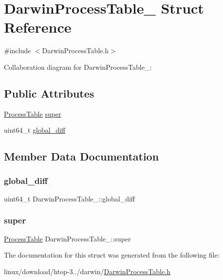\hypertarget{structDarwinProcessTable__}{}\section{Darwin\+Process\+Table\+\_\+ Struct Reference}
\label{structDarwinProcessTable__}


{\ttfamily \#include $<$Darwin\+Process\+Table.\+h$>$}



Collaboration diagram for Darwin\+Process\+Table\+\_\+\+:
\subsection*{Public Attributes}
\begin{DoxyCompactItemize}
\item 
\hyperlink{ProcessTable_8h_a54ec62da6f9d80d4d06e3845a2597a80}{Process\+Table} \hyperlink{structDarwinProcessTable___ac3c4f1c47db98b2098b890d2f16b735f}{super}
\item 
uint64\+\_\+t \hyperlink{structDarwinProcessTable___a50de6e8539c0ee2e76363a56871036ba}{global\+\_\+diff}
\end{DoxyCompactItemize}


\subsection{Member Data Documentation}
\mbox{\label{structDarwinProcessTable___a50de6e8539c0ee2e76363a56871036ba}} 
\subsubsection{\texorpdfstring{global\+\_\+diff}{global\_diff}}
{\footnotesize\ttfamily uint64\+\_\+t Darwin\+Process\+Table\+\_\+\+::global\+\_\+diff}

\mbox{\label{structDarwinProcessTable___ac3c4f1c47db98b2098b890d2f16b735f}} 
\subsubsection{\texorpdfstring{super}{super}}
{\footnotesize\ttfamily \hyperlink{ProcessTable_8h_a54ec62da6f9d80d4d06e3845a2597a80}{Process\+Table} Darwin\+Process\+Table\+\_\+\+::super}



The documentation for this struct was generated from the following file\+:\begin{DoxyCompactItemize}
\item 
linux/download/htop-\/3../darwin/\hyperlink{DarwinProcessTable_8h}{Darwin\+Process\+Table.\+h}\end{DoxyCompactItemize}
